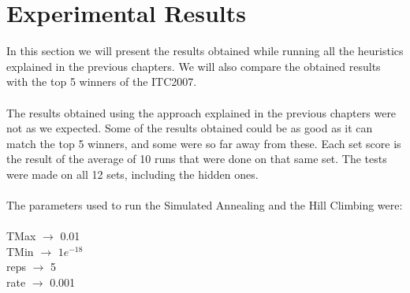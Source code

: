 \chapter{Experimental Results}
\label{sec:ExpResults}

In this section we will present the results obtained while running all the heuristics explained in the previous chapters. We will also compare the obtained results with the top 5 winners of the ITC2007.\\
\\
The results obtained using the approach explained in the previous chapters were not as we expected. Some of the results obtained could be as good as it can match the top 5 winners, and some were so far away from these. Each set score is the result of the average of 10 runs that were done on that same set. The tests were made on all 12 sets, including the hidden ones.\\
\\
The parameters used to run the Simulated Annealing and the Hill Climbing were:\\
\\
TMax $\rightarrow$ 0.01\\
TMin $\rightarrow$ $1e^{-18}$\\
reps $\rightarrow$ 5\\
rate $\rightarrow$ 0.001\\

